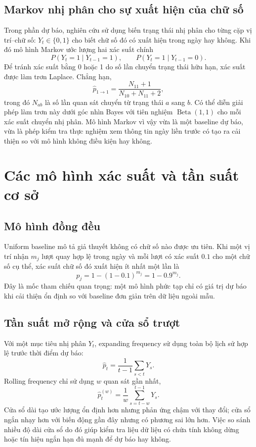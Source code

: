 \subsection{Markov nhị phân cho sự xuất hiện của chữ số}
Trong phần dự báo, nghiên cứu sử dụng biến trạng thái nhị phân cho từng cặp vị trí--chữ số: $Y_t\in\{0,1\}$ cho biết chữ số đó có xuất hiện trong ngày hay không. Khi đó mô hình Markov ước lượng hai xác suất chính
\[
P(Y_t=1\mid Y_{t-1}=1),\qquad
P(Y_t=1\mid Y_{t-1}=0).
\]
Để tránh xác suất bằng 0 hoặc 1 do số lần chuyển trạng thái hữu hạn, xác suất được làm trơn Laplace. Chẳng hạn,
\[
\hat p_{1\to1}=\frac{N_{11}+1}{N_{10}+N_{11}+2},
\]
trong đó $N_{ab}$ là số lần quan sát chuyển từ trạng thái $a$ sang $b$. Có thể diễn giải phép làm trơn này dưới góc nhìn Bayes với tiên nghiệm $\operatorname{Beta}(1,1)$ cho mỗi xác suất chuyển nhị phân. Mô hình Markov vì vậy vừa là một baseline dự báo, vừa là phép kiểm tra thực nghiệm xem thông tin ngày liền trước có tạo ra cải thiện so với mô hình không điều kiện hay không.

\section{Các mô hình xác suất và tần suất cơ sở}
\subsection{Mô hình đồng đều}
Uniform baseline mô tả giả thuyết không có chữ số nào được ưu tiên. Khi một vị trí nhận $m_j$ lượt quay hợp lệ trong ngày và mỗi lượt có xác suất $0.1$ cho một chữ số cụ thể, xác suất chữ số đó xuất hiện ít nhất một lần là
\[
p_j=1-(1-0.1)^{m_j}=1-0.9^{m_j}.
\]
Đây là mốc tham chiếu quan trọng: một mô hình phức tạp chỉ có giá trị dự báo khi cải thiện ổn định so với baseline đơn giản trên dữ liệu ngoài mẫu.

\subsection{Tần suất mở rộng và cửa sổ trượt}
Với một mục tiêu nhị phân $Y_t$, expanding frequency sử dụng toàn bộ lịch sử hợp lệ trước thời điểm dự báo:
\[
\hat p_t=\frac{1}{t-1}\sum_{s<t}Y_s.
\]
Rolling frequency chỉ sử dụng $w$ quan sát gần nhất,
\[
\hat p_t^{(w)}=\frac{1}{w}\sum_{s=t-w}^{t-1}Y_s.
\]
Cửa sổ dài tạo ước lượng ổn định hơn nhưng phản ứng chậm với thay đổi; cửa sổ ngắn nhạy hơn với biến động gần đây nhưng có phương sai lớn hơn. Việc so sánh nhiều độ dài cửa sổ do đó giúp kiểm tra liệu dữ liệu có chứa tính không dừng hoặc tín hiệu ngắn hạn đủ mạnh để dự báo hay không.

